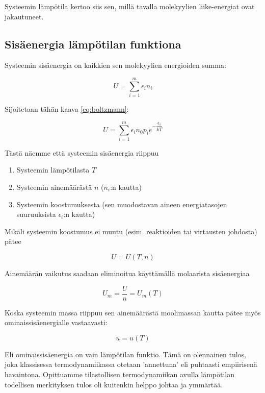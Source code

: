 \documentclass[12pt,a4paper,finnish]{book}
\begin{document}

Systeemin lämpötila kertoo siis sen, millä tavalla molekyylien liike-energiat ovat jakautuneet.

\subsection{Sisäenergia lämpötilan funktiona} %

Systeemin sisäenergia on kaikkien sen molekyylien energioiden summa:

\begin{equation}
 U = \sum_{i=1}^m\epsilon_in_i
\end{equation}

Sijoitetaan tähän kaava \ref{eq:boltzmann}:

\begin{equation}
 U = \sum_{i=1}^m\epsilon_in_0p_ie^{-\dfrac{\epsilon_i}{kT}}
\end{equation}

Tästä näemme että systeemin sisäenergia riippuu

\begin{enumerate}
 \item Systeemin lämpötilasta $T$
 \item Systeemin ainemäärästä $n$ ($n_i$:n kautta)
 \item Systeemin koostumuksesta (sen muodostavan aineen energiatasojen suuruuksista $\epsilon_i$:n kautta)
\end{enumerate}

Mikäli systeemin koostumus ei muutu (esim. reaktioiden tai virtausten johdosta) pätee

\begin{equation}
 U = U(T, n)
\end{equation}

Ainemäärän vaikutus saadaan eliminoitua käyttämällä molaarista sisäenergiaa

\begin{equation}
 U_m = \frac{U}{n} = U_m(T)
\end{equation}

Koska systeemin massa riippuu sen ainemäärästä moolimassan kautta pätee myös ominaissisäenergialle vastaavasti:

\begin{equation}
 u = u(T)
\end{equation}

Eli ominaissisäenergia on vain lämpötilan funktio. Tämä on olennainen tulos, joka klassisessa termodynamiikassa 
otetaan 'annettuna' eli puhtaasti empiirisenä havaintona. Opittuamme tilastollisen termodynamiikan avulla lämpötilan 
todellisen merkityksen tulos oli kuitenkin helppo johtaa ja ymmärtää.
\end{document}
